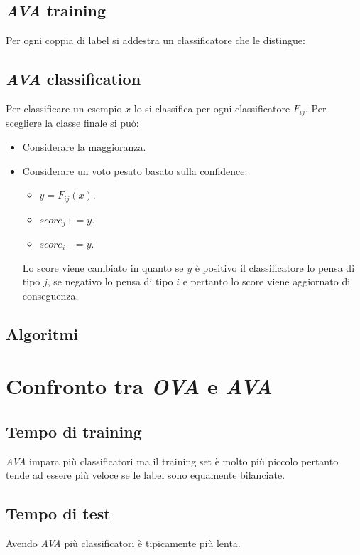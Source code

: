 	\subsection{\emph{AVA} training}
	Per ogni coppia di label si addestra un classificatore che le distingue:\\
	



	\subsection{\emph{AVA} classification}
	Per classificare un esempio $x$ lo si classifica per ogni classificatore $F_{ij}$.
	Per scegliere la classe finale si pu\`o:
	\begin{itemize}
		\item Considerare la maggioranza.
		\item Considerare un voto pesato basato sulla confidence:
		\begin{itemize}
			\item $y = F_{ij}(x)$.
			\item $score_j +=y$.
			\item $score_i -=y$.
		\end{itemize}
		Lo score viene cambiato in quanto se $y$ \`e positivo il classificatore lo pensa di tipo $j$, se negativo lo pensa di tipo $i$ e pertanto lo score viene aggiornato di conseguenza.
	\end{itemize}
	
	\subsection{Algoritmi}
	
	
	
	\section{Confronto tra \emph{OVA} e \emph{AVA}}
	
	\subsection{Tempo di training}
	\emph{AVA} impara pi\`u classificatori ma il training set \`e molto pi\`u piccolo pertanto tende ad essere pi\`u veloce se le label sono equamente bilanciate.
	
	\subsection{Tempo di test}
	Avendo \emph{AVA} pi\`u classificatori \`e tipicamente pi\`u lenta.
	
